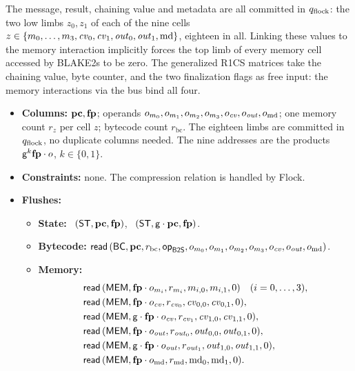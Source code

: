 The message, result, chaining value and metadata are all committed in $q_{\mathrm{flock}}$: the two low limbs $z_0,z_1$ of each of the nine cells $z\in\{m_0,\dots,m_3,\mathit{cv}_0,\mathit{cv}_1,\mathit{out}_0,\mathit{out}_1,\mathrm{md}\}$, eighteen in all. Linking these values to the memory interaction implicitly forces the top limb of every memory cell accessed by BLAKE2s to be zero. The generalized R1CS matrices take the chaining value, byte counter, and the two finalization flags as free input: the memory interactions via the bus bind all four.
\begin{itemize}
\item \textbf{Columns:} $\mathbf{pc},\mathbf{fp}$; operands $o_{m_0},o_{m_1},o_{m_2},o_{m_3},o_{\mathit{cv}},o_{\mathit{out}},o_{\mathrm{md}}$; one memory count $r_z$ per cell $z$; bytecode count $r_{\mathrm{bc}}$. The eighteen limbs are committed in $q_{\mathrm{flock}}$, no duplicate columns needed. The nine addresses are the products $\mathsf{g}^{k}\mathbf{fp}\cdot o$, $k\in\{0,1\}$.
\item \textbf{Constraints:} none. The compression relation is handled by Flock.
\item \textbf{Flushes:}
  \begin{itemize}
  \item \textbf{State:} \pull\ $( \mathsf{ST},\mathbf{pc},\mathbf{fp} )$, \push\ $( \mathsf{ST},\mathsf{g}\cdot\mathbf{pc},\mathbf{fp} )$.
  \item \textbf{Bytecode:} $\mathsf{read}\,( \mathsf{BC},\mathbf{pc},r_{\mathrm{bc}},\mathsf{op}_{\mathsf{B2S}},o_{m_0},o_{m_1},o_{m_2},o_{m_3},o_{\mathit{cv}},o_{\mathit{out}},o_{\mathrm{md}} )$.
  \item \textbf{Memory:}
    \begin{align*}
      &\mathsf{read}\,( \mathsf{MEM},\mathbf{fp}\cdot o_{m_i},r_{m_i},m_{i,0},m_{i,1},0 )\quad(i=0,\dots,3),\\
      &\mathsf{read}\,( \mathsf{MEM},\mathbf{fp}\cdot o_{\mathit{cv}},r_{\mathit{cv}_0},\mathit{cv}_{0,0},\mathit{cv}_{0,1},0 ),\\
      &\mathsf{read}\,( \mathsf{MEM},\mathsf{g}\cdot\mathbf{fp}\cdot o_{\mathit{cv}},r_{\mathit{cv}_1},\mathit{cv}_{1,0},\mathit{cv}_{1,1},0 ),\\
      &\mathsf{read}\,( \mathsf{MEM},\mathbf{fp}\cdot o_{\mathit{out}},r_{\mathit{out}_0},\mathit{out}_{0,0},\mathit{out}_{0,1},0 ),\\
      &\mathsf{read}\,( \mathsf{MEM},\mathsf{g}\cdot\mathbf{fp}\cdot o_{\mathit{out}},r_{\mathit{out}_1},\mathit{out}_{1,0},\mathit{out}_{1,1},0 ),\\
      &\mathsf{read}\,( \mathsf{MEM},\mathbf{fp}\cdot o_{\mathrm{md}},r_{\mathrm{md}},\mathrm{md}_0,\mathrm{md}_1,0 ).
    \end{align*}
  \end{itemize}
\end{itemize}

